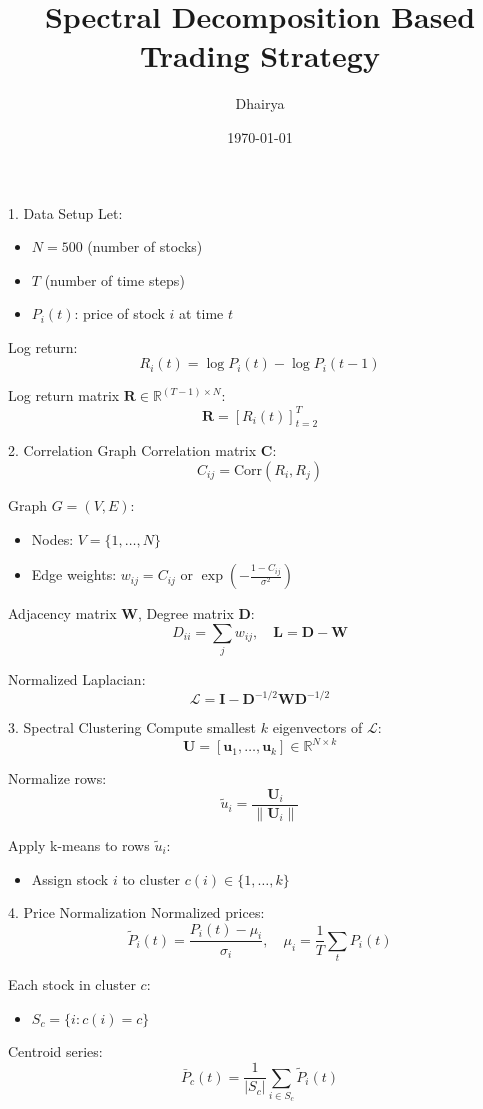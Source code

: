 \documentclass{beamer}
\title{Spectral Decomposition Based Trading Strategy}
\author{Dhairya}
\date{\today}
\begin{document}
\frame{\titlepage}

\begin{frame}{1. Data Setup}
Let:
\begin{itemize}
    \item $N = 500$ (number of stocks)
    \item $T$ (number of time steps)
    \item $P_i(t)$: price of stock $i$ at time $t$
\end{itemize}

Log return:
\[
R_i(t) = \log P_i(t) - \log P_i(t-1)
\]

Log return matrix $\mathbf{R} \in \mathbb{R}^{(T-1) \times N}$:
\[
\mathbf{R} = [R_i(t)]_{t=2}^T
\]
\end{frame}

\begin{frame}{2. Correlation Graph}
Correlation matrix $\mathbf{C}$:
\[
C_{ij} = \text{Corr}(R_i, R_j)
\]

Graph $G = (V, E)$:
\begin{itemize}
    \item Nodes: $V = \{1, \dots, N\}$
    \item Edge weights: $w_{ij} = C_{ij}$ or $\exp\left(-\frac{1 - C_{ij}}{\sigma^2}\right)$
\end{itemize}

Adjacency matrix $\mathbf{W}$, Degree matrix $\mathbf{D}$:
\[
D_{ii} = \sum_j w_{ij}, \quad \mathbf{L} = \mathbf{D} - \mathbf{W}
\]

Normalized Laplacian:
\[
\mathcal{L} = \mathbf{I} - \mathbf{D}^{-1/2} \mathbf{W} \mathbf{D}^{-1/2}
\]
\end{frame}

\begin{frame}{3. Spectral Clustering}
Compute smallest $k$ eigenvectors of $\mathcal{L}$:
\[
\mathbf{U} = [\mathbf{u}_1, \dots, \mathbf{u}_k] \in \mathbb{R}^{N \times k}
\]

Normalize rows:
\[
\tilde{u}_i = \frac{\mathbf{U}_i}{\|\mathbf{U}_i\|}
\]

Apply k-means to rows $\tilde{u}_i$:
\begin{itemize}
    \item Assign stock $i$ to cluster $c(i) \in \{1, \dots, k\}$
\end{itemize}
\end{frame}

\begin{frame}{4. Price Normalization}
Normalized prices:
\[
\tilde{P}_i(t) = \frac{P_i(t) - \mu_i}{\sigma_i}, \quad \mu_i = \frac{1}{T} \sum_t P_i(t)
\]

Each stock in cluster $c$:
\begin{itemize}
    \item $S_c = \{i : c(i) = c\}$
\end{itemize}

Centroid series:
\[
\bar{P}_c(t) = \frac{1}{|S_c|} \sum_{i \in S_c} \tilde{P}_i(t)
\]
\end{frame}
\end{document}
